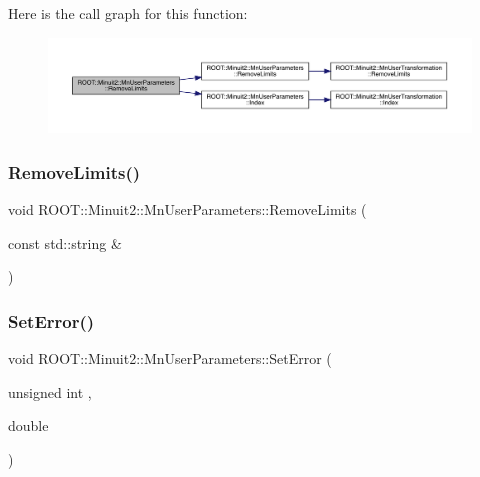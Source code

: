 Here is the call graph for this function\+:
\nopagebreak
\begin{figure}[H]
\begin{center}
\leavevmode
\includegraphics[width=350pt]{d6/d10/classROOT_1_1Minuit2_1_1MnUserParameters_a4aff83aa7fb5e9c0a7edf70f360f68fa_cgraph}
\end{center}
\end{figure}
\mbox{\label{classROOT_1_1Minuit2_1_1MnUserParameters_a4aff83aa7fb5e9c0a7edf70f360f68fa}} 
\subsubsection{\texorpdfstring{RemoveLimits()}{RemoveLimits()}\hspace{0.1cm}{\footnotesize\ttfamily [6/6]}}
{\footnotesize\ttfamily void R\+O\+O\+T\+::\+Minuit2\+::\+Mn\+User\+Parameters\+::\+Remove\+Limits (\begin{DoxyParamCaption}\item[{const std\+::string \&}]{ }\end{DoxyParamCaption})}

\mbox{\label{classROOT_1_1Minuit2_1_1MnUserParameters_a64cbb6833d91d7f3bdef5b4dec9ae20f}} 
\subsubsection{\texorpdfstring{SetError()}{SetError()}\hspace{0.1cm}{\footnotesize\ttfamily [1/6]}}
{\footnotesize\ttfamily void R\+O\+O\+T\+::\+Minuit2\+::\+Mn\+User\+Parameters\+::\+Set\+Error (\begin{DoxyParamCaption}\item[{unsigned int}]{,  }\item[{double}]{ }\end{DoxyParamCaption})}

